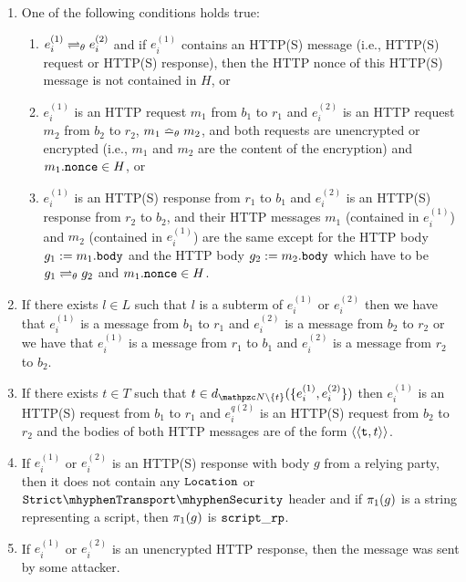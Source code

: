 \begin{theorem}
\begin{definition}
    \begin{enumerate}
      \item\label{eqe:distinction} One of the following conditions holds
        true:
        \begin{enumerate}
        \item\label{eqe:prototagequiv}
          $e_i^{(1)} \rightleftharpoons_{\theta} e_i^{(2)}$ and if $e_i^{(1)}$
          contains an HTTP(S) message (i.e., HTTP(S) request or HTTP(S)
          response), then the HTTP nonce of this HTTP(S) message is not
          contained in $H$, or
        \item\label{eqe:http-req} $e_i^{(1)}$ is an HTTP request $m_1$
          from $b_1$ to $r_1$ and $e_i^{(2)}$ is an HTTP request $m_2$
          from $b_2$ to $r_2$, $m_1 \bumpeq_{\theta} m_2$, and both
          requests are unencrypted or encrypted (i.e., $m_1$ and $m_2$ are
          the content of the encryption) and $m_1.\mathtt{nonce} \in H$, or
        \item\label{eqe:http-res} $e_i^{(1)}$ is an HTTP(S) response from
          $r_1$ to $b_1$ and $e_i^{(2)}$ is an HTTP(S) response from $r_2$
          to $b_2$, and their HTTP messages $m_1$ (contained in
          $e_i^{(1)}$) and $m_2$ (contained in $e_i^{(1)}$) are the same
          except for the HTTP body $g_1 := m_1.\mathtt{body}$ and the HTTP
          body $g_2 := m_2.\mathtt{body}$ which have to be
          $g_1 \rightleftharpoons_{\theta} g_2$ and $m_1.\mathtt{nonce} \in H$.
        \end{enumerate}
      \item\label{eqe:pre:l} If there exists $l \in L$ such that $l$ is a
        subterm of $e_i^{(1)}$ or $e_i^{(2)}$ then we have that
        $e_i^{(1)}$ is a message from $b_1$ to $r_1$ and $e_i^{(2)}$ is a
        message from $b_2$ to $r_2$ or we have that $e_i^{(1)}$ is a
        message from $r_1$ to $b_1$ and $e_i^{(2)}$ is a message from
        $r_2$ to $b_2$.
      \item\label{eqe:pre:t} If there exists $t \in T$ such that
        $t \in d_{\nonces\setminus\{t\}}(\{e_i^{(1)}, e_i^{(2)}\})$ 
        then $e_i^{(1)}$ is an HTTP(S) request from $b_1$ to $r_1$ 
        and $e_i^{q(2)}$ is an HTTP(S) request from $b_2$ to $r_2$ 
        and the bodies of both HTTP messages are of the form
        $\langle\langle\mathtt{t}, t\rangle\rangle$.
      \item\label{eqe:pre:rp-scripts} If $e_i^{(1)}$ or $e_i^{(2)}$ is an
        HTTP(S) response with body $g$ from a relying party, then it does
        not contain any $\mathtt{Location}$ or $\cSTS$ header
        and if $\pi_{1}({g})$ is a string representing a script, then
        $\pi_{1}({g})$ is $\mathtt{script\_rp}$.
      \item\label{eqe:pre:unencrypted-http} If $e_i^{(1)}$ or $e_i^{(2)}$
        is an unencrypted HTTP response, then the message was sent by some
        attacker.
    \end{enumerate}
  \end{definition}
  

\end{theorem}
